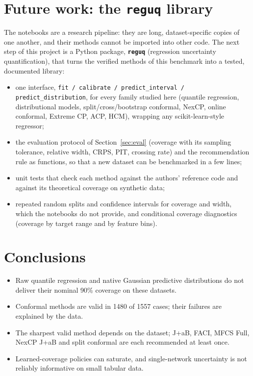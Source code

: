 \documentclass[11pt]{article}
\begin{document}
\section{Future work: the \texttt{reguq} library}\label{sec:future}
The notebooks are a research pipeline: they are long, dataset-specific copies of one another, and their methods cannot be imported
into other code. The next step of this project is a Python package, \textbf{\texttt{reguq}} (regression uncertainty quantification),
that turns the verified methods of this benchmark into a tested, documented library:
\begin{itemize}
\item one interface, \texttt{fit / calibrate / predict\_interval / predict\_distribution}, for every family studied here (quantile
regression, distributional models, split/cross/bootstrap conformal, NexCP, online conformal, Extreme CP, ACP, HCM), wrapping any
scikit-learn-style regressor;
\item the evaluation protocol of Section~\ref{sec:eval} (coverage with its sampling tolerance, relative width, CRPS, PIT, crossing
rate) and the recommendation rule as functions, so that a new dataset can be benchmarked in a few lines;
\item unit tests that check each method against the authors' reference code and against its theoretical coverage on synthetic data;
\item repeated random splits and confidence intervals for coverage and width, which the notebooks do not provide, and conditional
coverage diagnostics (coverage by target range and by feature bins).
\end{itemize}

\section{Conclusions}
\begin{itemize}
\item Raw quantile regression and native Gaussian predictive distributions do not deliver their nominal 90\% coverage on these datasets.
\item Conformal methods are valid in 1480 of 1557 cases; their failures are explained by the data.
\item The sharpest valid method depends on the dataset; J+aB, FACI, MFCS Full, NexCP J+aB and split conformal are each recommended at least once.
\item Learned-coverage policies can saturate, and single-network uncertainty is not reliably informative on small tabular data.
\end{itemize}
\end{document}
